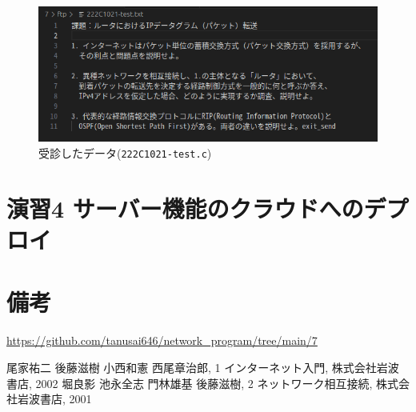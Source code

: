 \documentclass[documentclass]{jsarticle}
\begin{document}
\begin{figure}[H]
  \begin{center}
    \includegraphics*[]{figure/3-4.png}
  \end{center}
  \caption{受診したデータ(\texttt{222C1021-test.c})}
  \label{fig:3-4}
\end{figure}

\newpage
\section*{演習4 サーバー機能のクラウドへのデプロイ}

\newpage
\section*{備考}
\url{https://github.com/tanusai646/network_program/tree/main/7}

\begin{thebibliography}{9}
   尾家祐二 後藤滋樹 小西和憲 西尾章治郎, 1 インターネット入門, 株式会社岩波書店, 2002 
   堀良影 池永全志 門林雄基 後藤滋樹, 2 ネットワーク相互接続, 株式会社岩波書店, 2001
\end{thebibliography}
\end{document}
